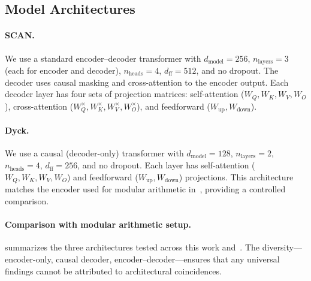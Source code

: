 \documentclass[11pt]{article}
\begin{document}
\subsection{Model Architectures}

\paragraph{SCAN.}
We use a standard encoder--decoder transformer with $d_{\text{model}} = 256$, $n_{\text{layers}} = 3$ (each for encoder and decoder), $n_{\text{heads}} = 4$, $d_{\text{ff}} = 512$, and no dropout. The decoder uses causal masking and cross-attention to the encoder output. Each decoder layer has four sets of projection matrices: self-attention ($W_Q, W_K, W_V, W_O$), cross-attention ($W^{\times}_Q, W^{\times}_K, W^{\times}_V, W^{\times}_O$), and feedforward ($W_{\text{up}}, W_{\text{down}}$).

\paragraph{Dyck.}
We use a causal (decoder-only) transformer with $d_{\text{model}} = 128$, $n_{\text{layers}} = 2$, $n_{\text{heads}} = 4$, $d_{\text{ff}} = 256$, and no dropout. Each layer has self-attention ($W_Q, W_K, W_V, W_O$) and feedforward ($W_{\text{up}}, W_{\text{down}}$) projections. This architecture matches the encoder used for modular arithmetic in~\citet{xu2026integrability}, providing a controlled comparison.

\paragraph{Comparison with modular arithmetic setup.}
 summarizes the three architectures tested across this work and~\citet{xu2026integrability}. The diversity---encoder-only, causal decoder, encoder--decoder---ensures that any universal findings cannot be attributed to architectural coincidences.
\end{document}
